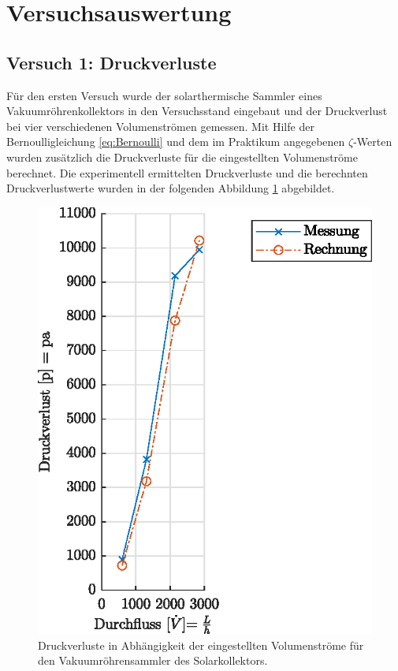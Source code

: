 \section{Versuchsauswertung}

\subsection{Versuch 1: Druckverluste}

Für den ersten Versuch wurde der solarthermische Sammler eines Vakuumröhrenkollektors in den Versuchsstand eingebaut und der Druckverlust bei vier verschiedenen Volumenströmen gemessen. 
Mit Hilfe der Bernoulligleichung \ref{eq:Bernoulli} und dem im Praktikum angegebenen $\zeta$-Werten wurden zusätzlich die Druckverluste für die eingestellten Volumenströme berechnet. Die experimentell ermittelten Druckverluste und die berechnten Druckverlustwerte wurden in der folgenden Abbildung \ref{fig:drucksammler} abgebildet. 

	\begin{figure}[H]
	\centering
	\includegraphics[height=0.3\textheight]{../DATA/dPPlot.eps}
	\caption[Druckverluste in Abhängigkeit der eingestellten Volumenströme für den Vakuumröhrensammler des Solarkollektors]{Druckverluste in Abhängigkeit der eingestellten Volumenströme für den Vakuumröhrensammler des Solarkollektors.}
	\label{fig:drucksammler}
	\end{figure}

